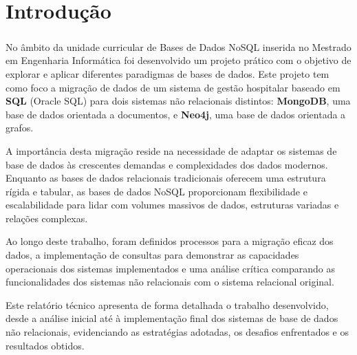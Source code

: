 \chapter{Introdução}
\paragraph{}
No âmbito da unidade curricular de Bases de Dados NoSQL inserida no Mestrado em Engenharia Informática foi desenvolvido um projeto prático com o objetivo de explorar e aplicar diferentes paradigmas de bases de dados. Este projeto tem como foco a migração de dados de um sistema de gestão hospitalar baseado em \textbf{SQL} (Oracle SQL) para dois sistemas não relacionais distintos: \textbf{MongoDB}, uma base de dados orientada a documentos, e \textbf{Neo4j}, uma base de dados orientada a grafos.

A importância desta migração reside na necessidade de adaptar os sistemas de base de dados às crescentes demandas e complexidades dos dados modernos. Enquanto as bases de dados relacionais tradicionais oferecem uma estrutura rígida e tabular, as bases de dados NoSQL proporcionam flexibilidade e escalabilidade para lidar com volumes massivos de dados, estruturas variadas e relações complexas.

Ao longo deste trabalho, foram definidos processos para a migração eficaz dos dados, a implementação de consultas para demonstrar as capacidades operacionais dos sistemas implementados e uma análise crítica comparando as funcionalidades dos sistemas não relacionais com o sistema relacional original.

Este relatório técnico apresenta de forma detalhada o trabalho desenvolvido, desde a análise inicial até à implementação final dos sistemas de base de dados não relacionais, evidenciando as estratégias adotadas, os desafios enfrentados e os resultados obtidos.